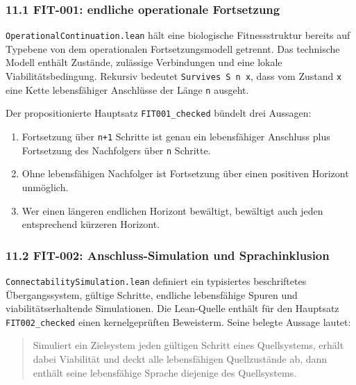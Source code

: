 \documentclass[
  10pt,
  a4paper,
]{article}
\providecommand{\tightlist}{%
  \setlength{\itemsep}{0pt}\setlength{\parskip}{0pt}}
\begin{document}
\hypertarget{fit-001-endliche-operationale-fortsetzung}{%
\subsubsection{11.1 FIT-001: endliche operationale
Fortsetzung}\label{fit-001-endliche-operationale-fortsetzung}}

\texttt{OperationalContinuation.lean} hält eine biologische
Fitnessstruktur bereits auf Typebene von dem operationalen
Fortsetzungsmodell getrennt. Das technische Modell enthält Zustände,
zulässige Verbindungen und eine lokale Viabilitätsbedingung. Rekursiv
bedeutet \texttt{Survives\ S\ n\ x}, dass vom Zustand \texttt{x} eine
Kette lebensfähiger Anschlüsse der Länge \texttt{n} ausgeht.

Der propositionierte Hauptsatz \texttt{FIT001\_checked} bündelt drei
Aussagen:

\begin{enumerate}
\def\labelenumi{\arabic{enumi}.}
\tightlist
\item
  Fortsetzung über \texttt{n+1} Schritte ist genau ein lebensfähiger
  Anschluss plus Fortsetzung des Nachfolgers über \texttt{n} Schritte.
\item
  Ohne lebensfähigen Nachfolger ist Fortsetzung über einen positiven
  Horizont unmöglich.
\item
  Wer einen längeren endlichen Horizont bewältigt, bewältigt auch jeden
  entsprechend kürzeren Horizont.
\end{enumerate}

\hypertarget{fit-002-anschluss-simulation-und-sprachinklusion}{%
\subsubsection{11.2 FIT-002: Anschluss-Simulation und
Sprachinklusion}\label{fit-002-anschluss-simulation-und-sprachinklusion}}

\texttt{ConnectabilitySimulation.lean} definiert ein typisiertes
beschriftetes Übergangssystem, gültige Schritte, endliche lebensfähige
Spuren und viabilitätserhaltende Simulationen. Die Lean-Quelle enthält
für den Hauptsatz \texttt{FIT002\_checked} einen kernelgeprüften
Beweisterm. Seine belegte Aussage lautet:

\begin{quote}
Simuliert ein Zielsystem jeden gültigen Schritt eines Quellsystems,
erhält dabei Viabilität und deckt alle lebensfähigen Quellzustände ab,
dann enthält seine lebensfähige Sprache diejenige des Quellsystems.
\end{quote}
\end{document}
